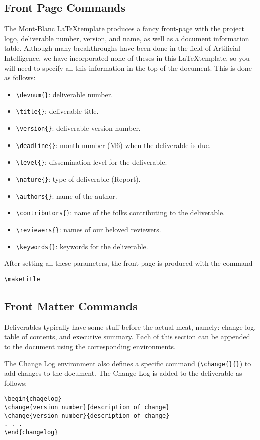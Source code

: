 \documentclass[11pt, a4paper, twoside]{montblanc2}
\begin{document}
\subsection{Front Page Commands}
The Mont-Blanc \LaTeX template produces a fancy front-page with the project logo, deliverable 
number, version, and name, as well as a document information table. Although many breakthroughs have 
been done in the field of Artificial Intelligence, we have incorporated none of theses in this 
\LaTeX template, so you will need to specify all this information in the top of the document. This 
is done as follows:
\begin{itemize}
\item \verb|\devnum{}|: deliverable number.
\item \verb|\title{}|: deliverable title.
\item \verb|\version{}|: deliverable version number.
\item \verb|\deadline{}|: month number (\eg M6) when the deliverable is due.
\item \verb|\level{}|: dissemination level for the deliverable.
\item \verb|\nature{}|: type of deliverable (\eg Report).
\item \verb|\authors{}|: name of the author. 
\item \verb|\contributors{}|: name of the folks contributing to the deliverable.
\item \verb|\reviewers{}|: names of our beloved reviewers.
\item \verb|\keywords{}|: keywords for the deliverable.
\end{itemize}

After setting all these parameters, the front page is produced with the command
\begin{verbatim}
\maketitle
\end{verbatim}

\subsection{Front Matter Commands}
Deliverables typically have some stuff before the actual meat, namely: change log, table of 
contents, and executive summary. Each of this section can be appended to the document using the 
corresponding environments.

The Change Log environment also defines a specific command (\verb|\change{}{}|) to add changes to 
the document. The Change Log is added to the deliverable as follows:
\begin{verbatim}
\begin{chagelog}
\change{version number}{description of change}
\change{version number}{description of change}
. . .
\end{changelog}
\end{verbatim}
\end{document}
